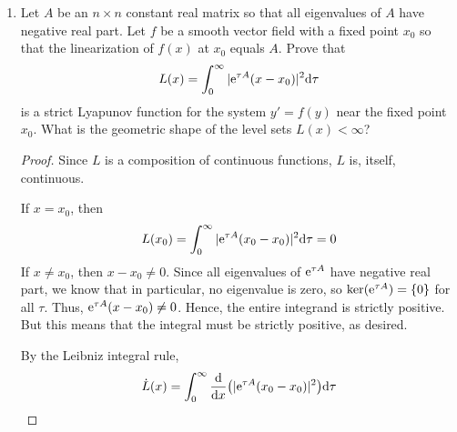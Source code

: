 \documentclass[../psets.tex]{subfiles}
\begin{document}
\begin{enumerate}
\begin{enumerate}
\begin{proof}
\begin{align*}
                A_4 &=
                \begin{pmatrix}
                    -6/5 & -1\\
                    -1 & -12/5\\
                \end{pmatrix}
            \end{align*}
            Computing eigenvalues, we learn that
            \begin{equation*}
                \boxed{x_3\text{ is asymptotically stable.}}
            \end{equation*}
            and
            \begin{equation*}
                \boxed{x_0,x_1,x_2\text{ are not even Lyapunov stable.}}
            \end{equation*}
        \end{proof}
    \end{enumerate}
    \item Let $A$ be an $n\times n$ constant real matrix so that all eigenvalues of $A$ have negative real part. Let $f$ be a smooth vector field with a fixed point $x_0$ so that the linearization of $f(x)$ at $x_0$ equals $A$. Prove that
    \begin{equation*}
        L(x) = \int_0^\infty|\e[\tau A](x-x_0)|^2\dd\tau
    \end{equation*}
    is a strict Lyapunov function for the system $y'=f(y)$ near the fixed point $x_0$. What is the geometric shape of the level sets $L(x)<\infty$?
    \begin{proof}
        Since $L$ is a composition of continuous functions, $L$ is, itself, continuous.\par
        If $x=x_0$, then
        \begin{equation*}
            L(x_0) = \int_0^\infty|\e[\tau A](x_0-x_0)|^2\dd\tau
            = 0
        \end{equation*}
        If $x\neq x_0$, then $x-x_0\neq 0$. Since all eigenvalues of $\e[\tau A]$ have negative real part, we know that in particular, no eigenvalue is zero, so $\ker(\e[\tau A])=\{0\}$ for all $\tau$. Thus, $\e[\tau A](x-x_0)\neq 0$. Hence, the entire integrand is strictly positive. But this means that the integral must be strictly positive, as desired.\par
        By the Leibniz integral rule,
        \begin{align*}
            \dot{L}(x) &= \int_0^\infty\dv{x}(|\e[\tau A](x_0-x_0)|^2)\dd\tau\\

\end{align*}
\end{proof}
\end{enumerate}
\end{document}

